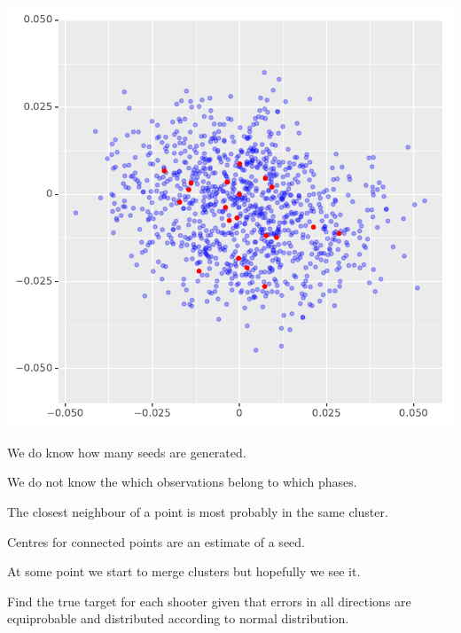 \documentclass[landscape,footrule]{foils}
\begin{document}
{\includegraphics[scale=0.55]{fast_meme_generation_iv}}

\begin{triangles}
\item We do know how many seeds are generated.
\item We do not know the which observations belong to which phases.
\item The closest neighbour of a point is most probably in the same cluster.
\item Centres for connected points are an estimate of a seed.
\item At some point we start to merge clusters but hopefully we see it.
\end{triangles}





Find the true target for each shooter given that errors in all directions are equiprobable and distributed according to normal distribution.\vspace*{-1cm}


\end{document}
